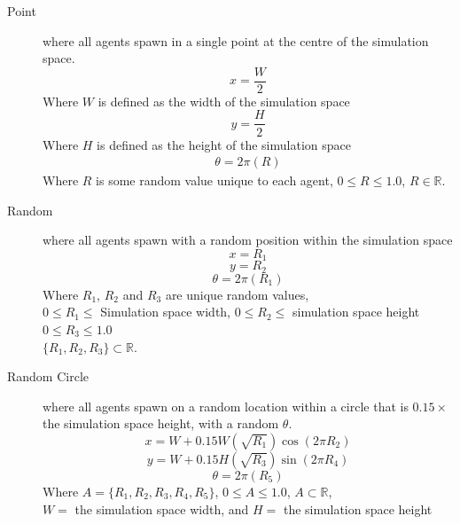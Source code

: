 \documentclass[]{report}
\begin{document}
\begin{description}
    \item[Point] where all agents spawn in a single point at the centre of the simulation space. 
    \begin{equation}
        x=\dfrac{W}{2}
    \end{equation}
    Where $W$ is defined as the width of the simulation space 
    \begin{equation}
        y=\dfrac{H}{2}
    \end{equation}
    Where $H$ is defined as the height of the simulation space
    \begin{gather}
        \theta=2\pi(R)
    \end{gather}
    Where $R$ is some random value unique to each agent, $ 0\leq R \leq 1.0$, $R \in \mathbb{R}$.
    \item[Random] where all agents spawn with a random position within the simulation space
    \begin{equation}
        x = R_{1}
    \end{equation}
    \begin{equation}
        y = R_{2}
    \end{equation}
    \begin{equation}
        \theta = 2\pi(R_{1})
    \end{equation}
    Where $R_{1}$, $R_{2}$ and $R_{3}$ are unique random values, \\
     $0 \leq R_{1} \leq $ Simulation space width, $0 \leq R_{2} \leq$ simulation space height $0 \leq R_{3} \leq 1.0$ \\ 
     $\{R_{1}, R_{2}, R_{3}\} \subset \mathbb{R}$.
    \item[Random Circle] where all agents spawn on a random location within a circle that is $0.15 \times$ the simulation space height, with a random $\theta$.
    \begin{equation}
        x = W + 0.15W(\sqrt{R_{1}}) \cos{(2\pi R_{2})}
    \end{equation}
    \begin{equation}
        y = W + 0.15H(\sqrt{R_{3}}) \sin{(2\pi R_{4})}
    \end{equation}
    \begin{equation}
        \theta = 2\pi(R_{5})
    \end{equation}
    Where $A=\{R_{1},R_{2},R_{3},R_{4},R_{5}\}$,  
    $0 \leq A \leq 1.0$, $A \subset \mathbb{R}$, \\
    $W =$ the simulation space width, and $H =$ the simulation space height

\end{description}
\end{document}
